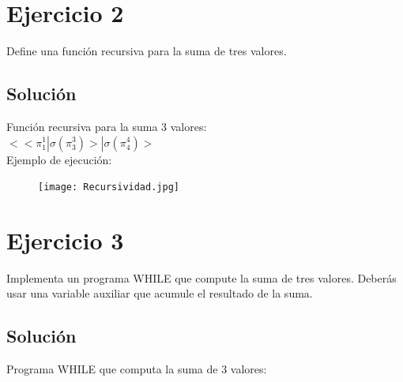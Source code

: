 \documentclass{article}
\begin{document}
\section{Ejercicio 2}
Define una función recursiva para la suma de tres valores.
\subsection*{Solución}
Función recursiva para la suma 3 valores: \\
$<<\pi^1_1 | \sigma(\pi^3_3)> | \sigma(\pi^4_4)>$\\
Ejemplo de ejecución:
\begin{figure}[h]
    \centering
    \texttt{[image: Recursividad.jpg]}
\end{figure}

\section{Ejercicio 3}
Implementa un programa WHILE que compute la suma de tres valores. Deberás usar una variable auxiliar que acumule el resultado de la suma.
\subsection*{Solución}
Programa WHILE que computa la suma de 3 valores:\\ 

\begin{whilecode}[H]

\end{whilecode}
\end{document}
